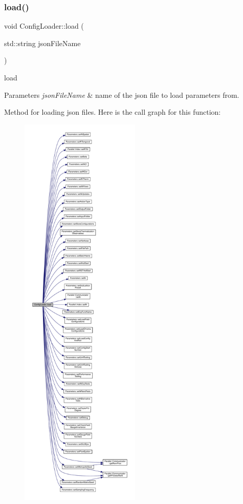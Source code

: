 \subsubsection{\texorpdfstring{load()}{load()}}
{\footnotesize\ttfamily void Config\+Loader\+::load (\begin{DoxyParamCaption}\item[{std\+::string}]{json\+File\+Name }\end{DoxyParamCaption})}



load 


\begin{DoxyParams}{Parameters}
{\em json\+File\+Name} & name of the json file to load parameters from.\\
\hline
\end{DoxyParams}
Method for loading json files. Here is the call graph for this function\+:
\nopagebreak
\begin{figure}[H]
\begin{center}
\leavevmode
\includegraphics[height=550pt]{namespace_config_loader_a26cf01adba9411ef1fa006d5068d7cc4_cgraph}
\end{center}
\end{figure}
